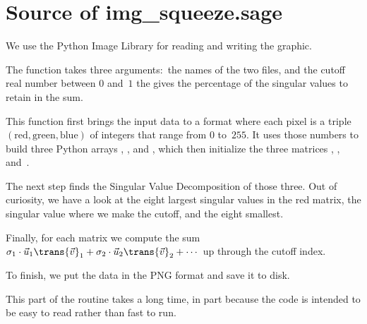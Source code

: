 \section{Source of img\_squeeze.sage}
We use the Python Image Library for reading and writing the graphic.

The function
takes three arguments:~the names of the two files, and
the cutoff real number between $0$ and~$1$ the gives the percentage 
of the singular values to retain in the sum.


This function first brings the input data to a format where each
pixel is a triple 
$(\text{red}, \text{green},\text{blue})$ of integers that range from 
$0$ to~$255$.
It uses those numbers to build 
three Python arrays , ,
and , which then initialize the 
three \Sage{} matrices ,
, and~.


The next step finds the Singular Value Decomposition of those three.
Out of curiosity, we have a look at the eight largest singular
values in the red matrix, the singular value where we make the cutoff,
and the eight smallest.


Finally, for each matrix we compute the sum
$\sigma_1\cdot\vec{u}_1\trans{\vec{v}}_1+\sigma_2\cdot\vec{u}_2\trans{\vec{v}}_2
   +\cdots$
up through the cutoff index.


To finish, we put the data in the PNG format and save it to 
disk.

This part of the routine takes a long time, in part because
the code is intended to be easy to read rather than fast to run.

\endinput


TODO:
1) mention Sage matrices are not mutable in matrix introduction.
Is mutable discussed in Intro?

2) vectors have to be forced to be row or col

2) Need int() fcns?  copy() fcn?